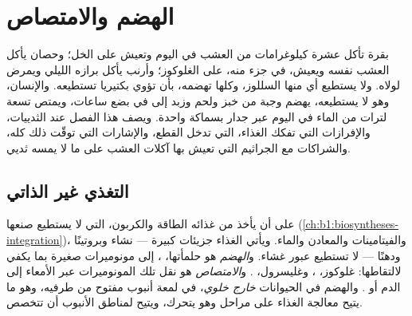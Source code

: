 \chapter{الهضم والامتصاص}\label{ch:b1:digestion-absorption}

بقرة تأكل عشرة كيلوغرامات من العشب في اليوم وتعيش على  الخل؛
وحصان يأكل العشب نفسه ويعيش، في جزء منه، على الغلوكوز؛ وأرنب يأكل
برازه الليلي ويمرض لولاه. ولا يستطيع أي منها  السللوز، وكلها
تهضمه، بأن تؤوي بكتيريا تستطيعه. والإنسان، وهو لا يستطيعه، يهضم
وجبة من خبز ولحم وزبد إلى    في بضع
ساعات، ويمتص تسعة لترات من الماء في اليوم عبر جدار بسماكة 
واحدة. ويصف هذا الفصل  عند الثدييات، 
والإفرازات التي تفكك الغذاء،  التي تدخل القطع، والإشارات
التي توقّت ذلك كله، والشراكات مع الجراثيم التي تعيش بها آكلات
العشب على ما لا يمسه  ثديي.

\section{التغذي غير الذاتي}

\begin{definition}\label{def:b1:digestion-absorption:nutrition}
على  أن يأخذ من غذائه الطاقة والكربون،   التي لا يستطيع صنعها (\cref{ch:b1:biosyntheses-integration})،
والفيتامينات والمعادن والماء. ويأتي الغذاء جزيئات كبيرة --- نشاء
وبروتينًا ودهنًا --- لا تستطيع عبور غشاء. و\emph{الهضم} هو
حلمأتها، ، إلى مونوميرات صغيرة بما يكفي لالتقاطها:
غلوكوز، ،  وغليسرول، .
و\emph{الامتصاص} هو نقل تلك المونوميرات عبر  الأمعاء إلى الدم
أو . والهضم في الحيوانات \emph{خارج خلوي}، في لمعة أنبوب
مفتوح من طرفيه، وهو ما يتيح معالجة الغذاء على مراحل وهو يتحرك،
ويتيح لمناطق الأنبوب أن تتخصص.
\end{definition}

